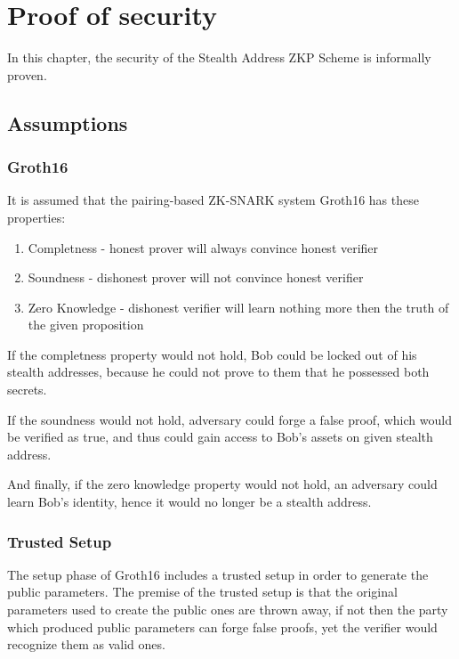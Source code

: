 \chapter{Proof of security}

In this chapter, the security of the Stealth Address ZKP Scheme is informally proven.

\section{Assumptions}

\subsection{Groth16}

It is assumed that the pairing-based ZK-SNARK system Groth16 has these properties:
\begin{enumerate}
    \item Completness - honest prover will always convince honest verifier
    \item Soundness - dishonest prover will not convince honest verifier
    \item Zero Knowledge - dishonest verifier will learn nothing more then the truth of the given proposition
\end{enumerate}

If the completness property would not hold, Bob could be locked out of his stealth
addresses, because he could not prove to them that he possessed both secrets.

If the soundness would not hold, adversary could forge a false proof, which
would be verified as true, and thus could gain access to Bob's assets on given
stealth address.

And finally, if the zero knowledge property would not hold, an adversary could
learn Bob's identity, hence it would no longer be a stealth address.

\subsection{Trusted Setup}

The setup phase of Groth16 includes a trusted setup in order to generate the
public parameters. The premise of the trusted setup is that the original parameters
used to create the public ones are thrown away, if not then the party which
produced public parameters can forge false proofs, yet the verifier would
recognize them as valid ones.

